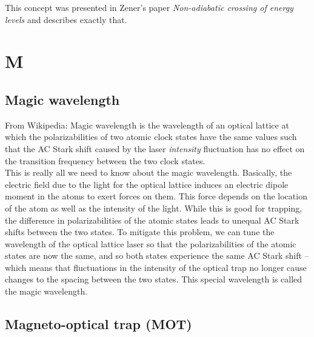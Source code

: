 \documentclass{book}
\theoremstyle{definition}
\begin{document}
This concept was presented in Zener's paper \textit{Non-adiabatic crossing of energy levels} \cite{zener1932non} and describes exactly that. 




\chapter*{M}



\section*{Magic wavelength}



From Wikipedia: Magic wavelength is the wavelength of an optical lattice at which the polarizabilities of two atomic clock states have the same values such that the AC Stark shift caused by the laser \textit{intensity} fluctuation has no effect on the transition frequency between the two clock states.\\


This is really all we need to know about the magic wavelength. Basically, the electric field due to the light for the optical lattice induces an electric dipole moment in the atoms to exert forces on them. This force depends on the location of the atom as well as the intensity of the light. While this is good for trapping, the difference in polarizabilities of the atomic states leads to unequal AC Stark shifts between the two states. To mitigate this problem, we can tune the wavelength of the optical lattice laser so that the polarizabilities of the atomic states are now the same, and so both states experience the same AC Stark shift -- which means that fluctuations in the intensity of the optical trap no longer cause changes to the spacing between the two states. This special wavelength is called the magic wavelength. 









\section*{Magneto-optical trap (MOT)}
\end{document}
